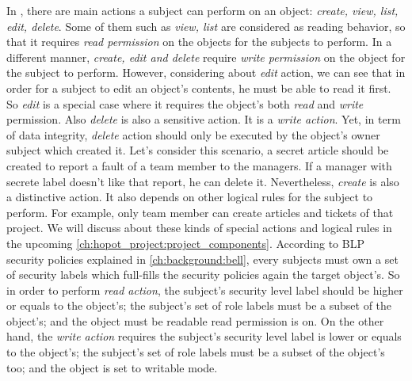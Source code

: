 In \myProject, there are main actions a subject can perform on an object: \emph{create, view, list, edit, delete}.
Some of them such as \emph{view, list} are considered as reading behavior, so that it requires \emph{read permission} on the objects for the subjects to perform.
In a different manner, \emph{create, edit and delete} require \emph{write permission} on the object for the subject to perform.
However, considering about \emph{edit} action, we can see that in order for a subject to edit an object's contents, he must be able to read it first.
So \emph{edit} is a special case where it requires the object's both \emph{read} and \emph{write} permission.
Also \emph{delete} is also a sensitive action.
It is a \emph{write action}.
Yet, in term of data integrity, \emph{delete} action should only be executed by the object's owner \ie subject which created it.
Let's consider this scenario, a secret article should be created to report a fault of a team member to the managers.
If a manager with secrete label doesn't like that report, he can delete it.
Nevertheless, \emph{create} is also a distinctive action.
It also depends on other logical rules for the subject to perform.
For example, only team member can create articles and tickets of that project.
We will discuss about these kinds of special actions and logical rules in the upcoming \autoref{ch:hopot_project:project_components}.
According to BLP security policies explained in \autoref{ch:background:bell}, every subjects must own a set of security labels which full-fills the security policies again the target object's.
So in order to perform \emph{read action}, the subject's security level label should be higher or equals to the object's;
the subject's set of role labels must be a subset of the object's;
and the object must be readable \ie read permission is on.
On the other hand, the \emph{write action} requires the subject's security level label is lower or equals to the object's;
the subject's set of role labels must be a subset of the object's too;
and the object is set to writable mode.

